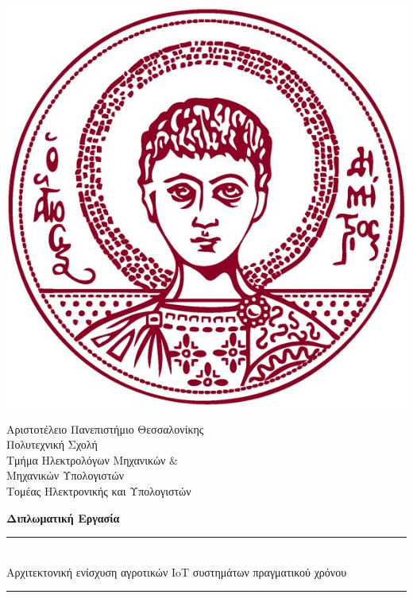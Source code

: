 \documentclass[a4paper,12 pt,oneside]{report}
\begin{document}
\begin{titlepage}

	\noindent
	\begin{minipage}[c]{0.3\textwidth}
		\includegraphics[width=\linewidth]{./images/title/authLogoTr.jpg}
	\end{minipage}
	\hfill
	\begin{minipage}[c]{0.65\textwidth}
		\raggedright
		\large Αριστοτέλειο Πανεπιστήμιο Θεσσαλονίκης \\
		Πολυτεχνική Σχολή \\
		Τμήμα Ηλεκτρολόγων Μηχανικών $\&$ \\ Μηχανικών Υπολογιστών\\
		\normalsize{Τομέας Ηλεκτρονικής και Υπολογιστών} \\[5cm]
	\end{minipage}

	\vspace{1.5cm}

	\begin{center}
		\Large \textbf{Διπλωματική Εργασία} \\[0.8cm]

		\rule{350pt}{2pt} \\[0.6cm]

		{\fontsize{20.26pt}{1em}\selectfont
		Αρχιτεκτονική ενίσχυση
		αγροτικών IoT συστημάτων
		πραγματικού χρόνου
		}
		\rule{350pt}{2pt} \\[2cm]


\end{center}
\end{titlepage}
\end{document}
